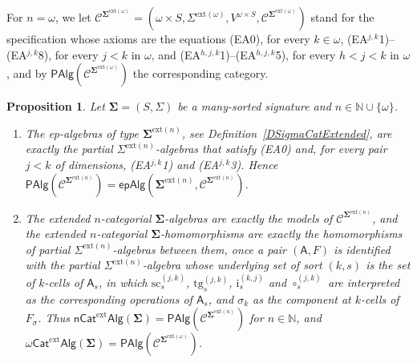\documentclass{amsart}
\theoremstyle{plain}
\newtheorem{proposition}[theorem]{Proposition}
\theoremstyle{definition}
\begin{document}
For $n=\omega$, we let $\boldsymbol{\mathcal{C}}^{\mathbf{\Sigma}^{\mathrm{ext}(\omega)}}=(\omega\times S,\Sigma^{\mathrm{ext}(\omega)},V^{\omega\times S},\mathcal{C}^{\mathbf{\Sigma}^{\mathrm{ext}(\omega)}})$ stand for the specification whose axioms are the equations (EA0), for every $k\in\omega$, (EA$^{j,k}$1)--(EA$^{j,k}$8), for every $j<k$ in $\omega$, and (EA$^{h,j,k}$1)--(EA$^{h,j,k}$5), for every $h<j<k$ in $\omega$, and by $\mathsf{PAlg}(\boldsymbol{\mathcal{C}}^{\mathbf{\Sigma}^{\mathrm{ext}(\omega)}})$ the corresponding category.

\begin{proposition}\label{PExtendedIdent}
Let $\mathbf{\Sigma}=(S,\Sigma)$ be a many-sorted signature and $n\in\mathbb{N}\cup\{\omega\}$.
\begin{enumerate}
\item The ep-algebras of type $\mathbf{\Sigma}^{\mathrm{ext}(n)}$, see Definition~\ref{DSigmaCatExtended}, are exactly the partial $\Sigma^{\mathrm{ext}(n)}$-algebras that satisfy (EA0) and, for every pair $j<k$ of dimensions, (EA$^{j,k}$1) and (EA$^{j,k}$3). Hence $\mathsf{PAlg}(\boldsymbol{\mathcal{C}}^{\mathbf{\Sigma}^{\mathrm{ext}(n)}})=\mathsf{epAlg}(\mathbf{\Sigma}^{\mathrm{ext}(n)},\mathcal{C}^{\mathbf{\Sigma}^{\mathrm{ext}(n)}})$.
\item The extended $n$-categorial $\mathbf{\Sigma}$-algebras are exactly the models of $\boldsymbol{\mathcal{C}}^{\mathbf{\Sigma}^{\mathrm{ext}(n)}}$, and the extended $n$-categorial $\mathbf{\Sigma}$-homomorphisms are exactly the homomorphisms of partial $\Sigma^{\mathrm{ext}(n)}$-algebras between them, once a pair $(\mathsf{A},F)$ is identified with the partial $\Sigma^{\mathrm{ext}(n)}$-algebra whose underlying set of sort $(k,s)$ is the set of $k$-cells of $\mathsf{A}_{s}$, in which $\mathrm{sc}^{(j,k)}_{s}$, $\mathrm{tg}^{(j,k)}_{s}$, $\mathrm{i}^{(k,j)}_{s}$ and $\circ^{(j,k)}_{s}$ are interpreted as the corresponding operations of $\mathsf{A}_{s}$, and $\sigma_{k}$ as the component at $k$-cells of $F_{\sigma}$. Thus $\mathsf{nCat}^{\mathrm{ext}}\mathsf{Alg}(\mathbf{\Sigma})=\mathsf{PAlg}(\boldsymbol{\mathcal{C}}^{\mathbf{\Sigma}^{\mathrm{ext}(n)}})$ for $n\in\mathbb{N}$, and $\omega\mathsf{Cat}^{\mathrm{ext}}\mathsf{Alg}(\mathbf{\Sigma})=\mathsf{PAlg}(\boldsymbol{\mathcal{C}}^{\mathbf{\Sigma}^{\mathrm{ext}(\omega)}})$.
\end{enumerate}
\end{proposition}
\end{document}
